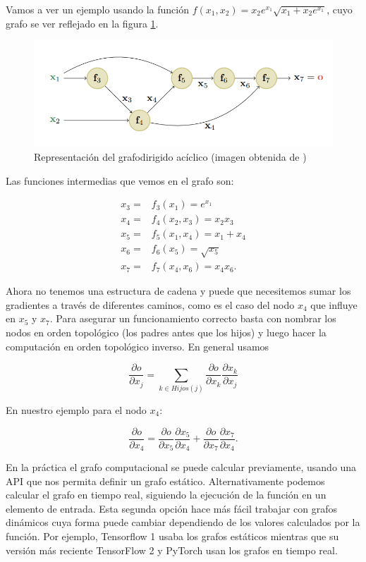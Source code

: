 Vamos a ver un ejemplo usando la función $f(x_1,x_2)=x_2e^{x_1}\sqrt{x_1+x_2e^{x_1}}$, cuyo grafo se ver reflejado en la figura \ref{fig:def.grafo}.


\begin{figure}
    \centering
    \includegraphics[width=1.0\linewidth]{Plantilla_TFG_latex/imagenes/Mat/Definicion/graf.png}
    \caption{Representación del grafodirigido acíclico (imagen obtenida de \cite{murphy2022probabilistic})}
    \label{fig:def.grafo}
\end{figure}


Las funciones intermedias que vemos en el grafo son:

\begin{align*}
x_3= &f_3(x_1)=e^{x_1} \\
x_4 = &f_4(x_2,x_3)=x_2x_3 \\
x_5=&f_5(x_1,x_4)=x_1 + x_4 \\
x_6=&f_6(x_5) = \sqrt{x_5} \\
x_7=&f_7(x_4,x_6)=x_4x_6 .
\end{align*}

Ahora no tenemos una estructura de cadena y puede que necesitemos sumar los gradientes a través de diferentes caminos, como es el caso del nodo $x_4$ que influye en $x_5$ y $x_7$. Para asegurar un funcionamiento correcto basta con nombrar los nodos en orden topológico (los padres antes que los hijos) y luego hacer la computación en orden topológico inverso. En general usamos

$$ \frac{\partial o }{ \partial x_j } = \sum_{k \in Hijos(j)} \frac{\partial o}{ \partial x_k} \frac{\partial x_k}{\partial x_j} $$

En nuestro ejemplo para el nodo $x_4$:

$$   \frac{\partial o }{ \partial x_4 }  =  \frac{\partial o}{ \partial x_5} \frac{\partial x_5}{\partial x_4} +\frac{\partial o}{ \partial x_7} \frac{\partial x_7}{\partial x_4} .$$


En la práctica el grafo computacional se puede calcular previamente, usando una API que nos permita definir un grafo estático. Alternativamente podemos calcular el grafo en tiempo real, siguiendo la ejecución de la función en un elemento de entrada. Esta segunda opción hace más fácil trabajar con grafos dinámicos cuya forma puede cambiar dependiendo de los valores calculados por la función. Por ejemplo, Tensorflow 1 usaba los grafos estáticos mientras que su versión más reciente TensorFlow 2 y PyTorch usan los grafos en tiempo real. 




